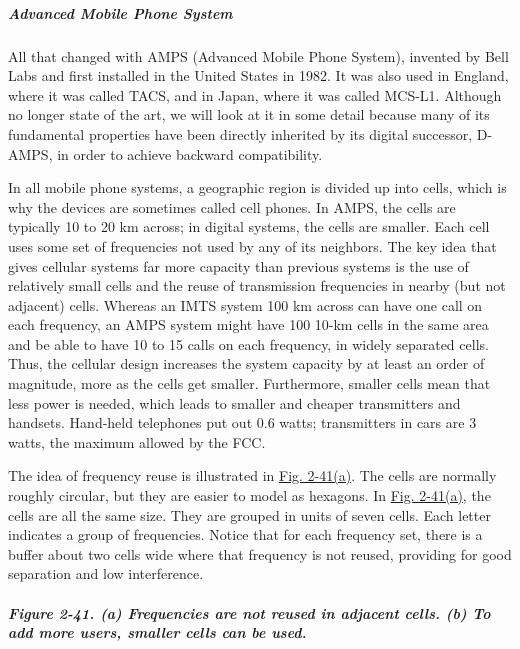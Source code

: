\documentclass[b5paper,11pt]{memoir}
\begin{document}
\protect\hypertarget{0130661023_ch02lev1sec6.htmlux5cux23ch02lev3sec19}{}{}

\subparagraph{Advanced Mobile Phone System}

All that changed with {AMPS} ({Advanced Mobile Phone System}), invented
by Bell Labs and first installed in the United States in 1982. It was
also used in England, where it was called TACS, and in Japan, where it
was called MCS-L1. Although no longer state of the art, we will look at
it in some detail because many of its fundamental properties have been
directly inherited by its digital successor, D-AMPS, in order to achieve
backward compatibility.

In all mobile phone systems, a geographic region is divided up into
{cells}, which is why the devices are sometimes called cell phones. In
AMPS, the cells are typically 10 to 20 km across; in digital systems,
the cells are smaller. Each cell uses some set of frequencies not used
by any of its neighbors. The key idea that gives cellular systems far
more capacity than previous systems is the use of relatively small cells
and the reuse of transmission frequencies in nearby (but not adjacent)
cells. Whereas an IMTS system 100 km across can have one call on each
frequency, an AMPS system might have 100 10-km cells in the same area
and be able to have 10 to 15 calls on each frequency, in widely
separated cells. Thus, the cellular design increases the system capacity
by at least an order of magnitude, more as the cells get smaller.
Furthermore, smaller cells mean that less power is needed, which leads
to smaller and cheaper transmitters and handsets. Hand-held telephones
put out 0.6 watts; transmitters in cars are 3 watts, the maximum allowed
by the FCC.

The idea of frequency reuse is illustrated in
\protect\hyperlink{0130661023_ch02lev1sec6.htmlux5cux23ch02fig41}{Fig.
2-41(a)}. The cells are normally roughly circular, but they are easier
to model as hexagons. In
\protect\hyperlink{0130661023_ch02lev1sec6.htmlux5cux23ch02fig41}{Fig.
2-41(a)}, the cells are all the same size. They are grouped in units of
seven cells. Each letter indicates a group of frequencies. Notice that
for each frequency set, there is a buffer about two cells wide where
that frequency is not reused, providing for good separation and low
interference.

\subparagraph[Figure 2-41. (a) Frequencies are not reused in adjacent
cells. (b) To add more users, smaller cells can be
used.]{\texorpdfstring{\protect\hypertarget{0130661023_ch02lev1sec6.htmlux5cux23ch02fig41}{}{}Figure
2-41. (a) Frequencies are not reused in adjacent cells. (b) To add more
users, smaller cells can be
used.}{Figure 2-41. (a) Frequencies are not reused in adjacent cells. (b) To add more users, smaller cells can be used.}}
\end{document}
